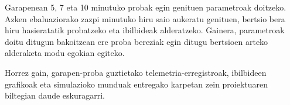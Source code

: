 Garapenean 5, 7 eta 10 minutuko probak egin genituen parametroak doitzeko. Azken ebaluaziorako zazpi minutuko hiru saio aukeratu genituen, bertsio bera hiru hasieratatik probatzeko eta ibilbideak alderatzeko. Gainera, parametroak doitu ditugun bakoitzean ere proba bereziak egin ditugu bertsioen arteko alderaketa modu egokian egiteko.

Horrez gain, garapen-proba guztietako telemetria-erregistroak, ibilbideen grafikoak eta simulazioko munduak entregako karpetan zein proiektuaren biltegian daude eskuragarri.

